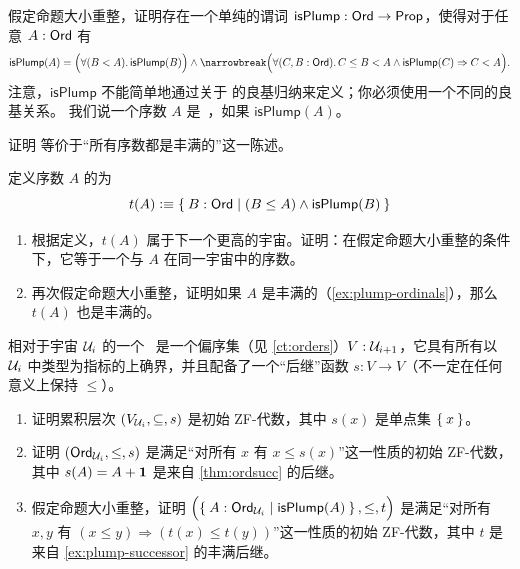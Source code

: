 \begin{ex}\label{ex:plump-ordinals}
  假定命题大小重整，证明存在一个单纯的谓词 $\mathsf{isPlump}:\mathsf{Ord}\to\mathsf{Prop}$，使得对于任意 $A:\mathsf{Ord}$ 有
  \begin{multline*}\label{eq:plump}
    \mathsf{isPlump}(A) = \Parens{\fall{B<A} \mathsf{isPlump}(B)} \wedge\narrowbreak
    \Parens{\fall{C,B:\ord} C\le B < A \wedge \mathsf{isPlump}(C) \Rightarrow C < A}.
  \end{multline*}
  注意，$\mathsf{isPlump}$ 不能简单地通过关于 \ord 的良基归纳来定义；你必须使用一个不同的良基关系。
  我们说一个序数 $A$ 是~\cite{taylor:ordinals,Taylor99}，如果 $\mathsf{isPlump}(A)$。
\end{ex}

\begin{ex}\label{ex:not-plump}
  证明 \LEM{} 等价于``所有序数都是丰满的''这一陈述。
\end{ex}

\begin{ex}\label{ex:plump-successor}
  定义序数 $A$ 的为
  \[ t(A) \defeq \setof{ B:\ord | (B\le A) \wedge \mathsf{isPlump}(B) } \]
  \begin{enumerate}
  \item 根据定义，$t(A)$ 属于下一个更高的宇宙。证明：在假定命题大小重整的条件下，它等于一个与 $A$ 在同一宇宙中的序数。
  \item 再次假定命题大小重整，证明如果 $A$ 是丰满的（\cref{ex:plump-ordinals}），那么 $t(A)$ 也是丰满的。
  \end{enumerate}
\end{ex}

\begin{ex}\label{ex:ZF-algebras}
  相对于宇宙 $\mathcal{U}_i$ 的一个~\cite{JoyalMoerdijk1995}
  是一个偏序集（见 \cref{ct:orders}）$V:\mathcal{U}_{i+1}$，它具有所有以 $\mathcal{U}_i$ 中类型为指标的上确界，并且配备了一个``后继''函数 $s:V\to V$（不一定在任何意义上保持 $\le$）。
  \begin{enumerate}
  \item 证明累积层次 $(V_{\mathcal{U}_i},\subseteq,s)$ 是初始 ZF-代数，其中 $s(x)$ 是单点集 $\Set{x}$。
  \item 证明 $(\mathsf{Ord}_{\mathcal{U}_i},\le,s)$ 是满足``对所有 $x$ 有 $x\le s(x)$''这一性质的初始 ZF-代数，其中 $s(A)=A+\mathbf{1}$ 是来自 \cref{thm:ordsucc} 的后继。
  \item 假定命题大小重整，证明 $\Parens{\setof{A:\ord_{\UU_i} | \mathsf{isPlump}(A) },\le,t}$ 是满足``对所有 $x,y$ 有 $(x\le y) \Rightarrow (t(x)\le t(y))$''这一性质的初始 ZF-代数，其中 $t$ 是来自 \cref{ex:plump-successor} 的丰满后继。
  \end{enumerate}
\end{ex}

